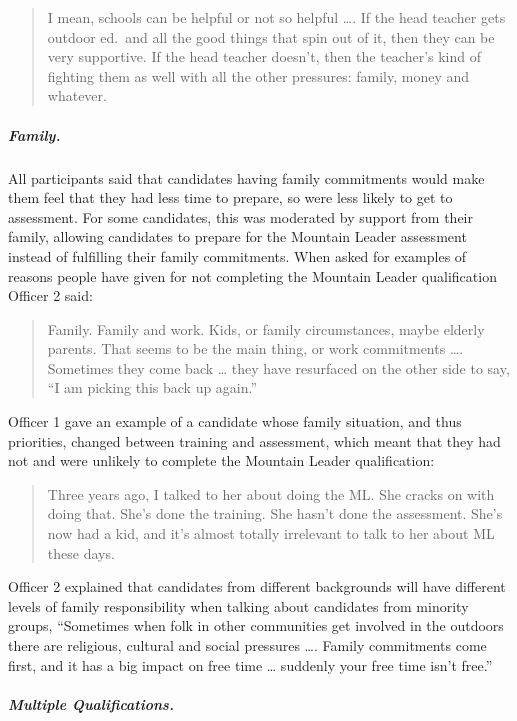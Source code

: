 \documentclass[
  12pt,
  a4paper,
]{book}
\begin{document}
\begin{quote}
I mean, schools can be helpful or not so helpful \ldots. If the head teacher gets outdoor ed.~and all the good things that spin out of it, then they can be very supportive. If the head teacher doesn't, then the teacher's kind of fighting them as well with all the other pressures: family, money and whatever.
\end{quote}

\hypertarget{family.}{%
\subparagraph{Family.}\label{family.}}

All participants said that candidates having family commitments would make them feel that they had less time to prepare, so were less likely to get to assessment. For some candidates, this was moderated by support from their family, allowing candidates to prepare for the Mountain Leader assessment instead of fulfilling their family commitments. When asked for examples of reasons people have given for not completing the Mountain Leader qualification Officer 2 said:

\begin{quote}
Family. Family and work. Kids, or family circumstances, maybe elderly parents. That seems to be the main thing, or work commitments \ldots. Sometimes they come back \ldots{} they have resurfaced on the other side to say, ``I am picking this back up again.''
\end{quote}

Officer 1 gave an example of a candidate whose family situation, and thus priorities, changed between training and assessment, which meant that they had not and were unlikely to complete the Mountain Leader qualification:

\begin{quote}
Three years ago, I talked to her about doing the ML. She cracks on with doing that. She's done the training. She hasn't done the assessment. She's now had a kid, and it's almost totally irrelevant to talk to her about ML these days.
\end{quote}

Officer 2 explained that candidates from different backgrounds will have different levels of family responsibility when talking about candidates from minority groups, ``Sometimes when folk in other communities get involved in the outdoors there are religious, cultural and social pressures \ldots. Family commitments come first, and it has a big impact on free time \ldots{} suddenly your free time isn't free.''

\hypertarget{multiple-qualifications.}{%
\subparagraph{Multiple Qualifications.}\label{multiple-qualifications.}}
\end{document}
